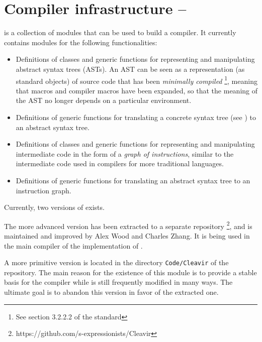 \chapter{Compiler infrastructure -- \cleavir{}}

\cleavir{} is a collection of modules that can be used to build a
\commonlisp{} compiler.  It currently contains modules for the
following functionalities:

\begin{itemize}
\item Definitions of classes and generic functions for representing
  and manipulating abstract syntax trees (ASTs).  An AST can be seen
  as a representation (as standard objects) of source code that has
  been \emph{minimally compiled}%
  \footnote{See section 3.2.2.2 of the \commonlisp{} standard},
  meaning that macros and compiler macros have been expanded, so that
  the meaning of the AST no longer depends on a particular
  environment.
\item Definitions of generic functions for translating a concrete
  syntax tree (see ) to an abstract
  syntax tree.
\item Definitions of classes and generic functions for representing
  and manipulating intermediate code in the form of a \emph{graph of
    instructions}, similar to the intermediate code used in compilers
  for more traditional languages.
\item Definitions of generic functions for translating an abstract
  syntax tree to an instruction graph.
\end{itemize}

Currently, two versions of \cleavir{} exists.

The more advanced version has been extracted to a separate repository%
\footnote{https://github.com/s-expressionists/Cleavir}, and is
maintained and improved by Alex Wood and Charles Zhang.  It is being
used in the main compiler of the \clasp{} implementation of
\commonlisp{}.

A more primitive version is located in the directory
\texttt{Code/Cleavir} of the \sysname{} repository.  The main reason
for the existence of this module is to provide a stable basis for the
\sysname{} compiler while \sysname{} is still frequently modified in
many ways.  The ultimate goal is to abandon this version in favor of
the extracted one.
